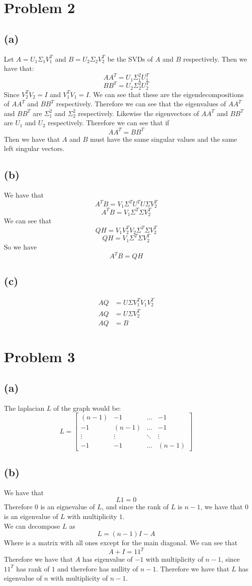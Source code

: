 \documentclass[11pt]{article}
\begin{document}
\section*{Problem 2}
\subsection*{(a)}
Let $A = U_1\Sigma_1 V_1^T$ and $B = U_2\Sigma_2 V_2^T$ be the SVDs of $A$ and $B$ respectively.
Then we have that:
$$AA^T = U_1\Sigma_1^2 U_1^T$$
$$BB^T = U_2\Sigma_2^2 U_2^T$$
Since $V_2^TV_2=I$ and $V_1^TV_1=I$. We can see that these are the eigendecompositions of 
$AA^T$ and $BB^T$ respectively. Therefore we can see that 
the eigenvalues of $AA^T$ and $BB^T$ are $\Sigma_1^2$ and $\Sigma_2^2$ respectively. Likewise
the eigenvectors of $AA^T$ and $BB^T$ are $U_1$ and $U_2$ respectively. Therefore we can see that
if 
$$AA^T = BB^T$$
Then we have that $A$ and $B$ must have the same singular values and the same left 
singular vectors.
\subsection*{(b)}
We have that 
$$A^TB = V_1 \Sigma^T U^T U \Sigma V_2^T$$
$$A^TB = V_1 \Sigma^T \Sigma V_2^T$$
We can see that 
$$QH= V_1V_2^T V_2 \Sigma^T \Sigma V_2^T$$
$$QH = V_1 \Sigma^T \Sigma V_2^T$$
So we have
$$A^TB = QH$$
\subsection*{(c)}
\begin{align*}
    AQ &= U\Sigma V_1^T V_1 V_2^T\\
    AQ &= U\Sigma V_2^T\\
    AQ &= B
\end{align*}
\section*{Problem 3}
\subsection*{(a)}
The laplacian $L$ of the graph would be:
$$L=\begin{bmatrix}
    (n-1) & -1 & \dots & -1\\
    -1 & (n-1) & \dots & -1\\
    \vdots & \vdots & \ddots & \vdots\\
    -1 & -1 & \dots & (n-1)
\end{bmatrix}$$
\subsection*{(b)}
We have that 
$$L1 = 0$$
Therefore $0$ is an eignevalue of $L$, and since the rank of 
$L$ is $n-1$, we have that $0$ is an eigenvalue of $L$ with multiplicity $1$.\\
We can decompose $L$ as
$$L =(n-1)I-A$$
Where is a matrix with all ones except for the main diagonal. We can see that 
$$A+I = 11^T$$
Therefore we have that $A$ has eigenvalue of $-1$ with multiplicity of 
$n-1$, since $11^T$ has rank of $1$ and therefore has nullity of $n-1$. Therefore we have that 
$L$ has eigenvalue of $n$ with multiplicity of $n-1$.
\end{document}
